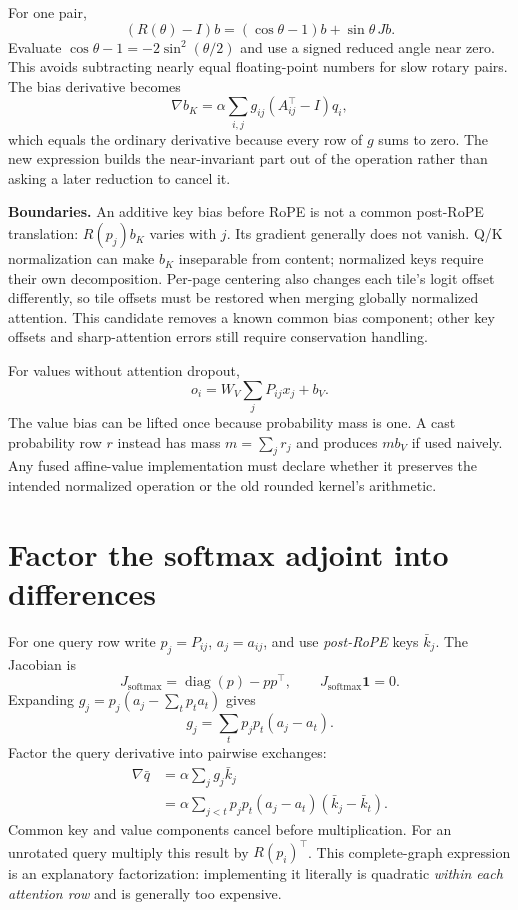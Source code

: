 \documentclass[11pt]{article}
\newcommand{\sm}{\operatorname{softmax}}
\newcommand{\diag}{\operatorname{diag}}
\begin{document}
For one pair,
\begin{equation}
 (R(\theta)-I)b=(\cos\theta-1)b+\sin\theta\,Jb.
\end{equation}
Evaluate $\cos\theta-1=-2\sin^2(\theta/2)$ and use a signed reduced angle near zero. This avoids subtracting nearly equal floating-point numbers for slow rotary pairs. The bias derivative becomes
\begin{equation}
 \nabla b_K=\alpha\sum_{i,j}g_{ij}(A_{ij}^\top-I)q_i,
\end{equation}
which equals the ordinary derivative because every row of $g$ sums to zero. The new expression builds the near-invariant part out of the operation rather than asking a later reduction to cancel it.

\textbf{Boundaries.} An additive key bias before RoPE is not a common post-RoPE translation: $R(p_j)b_K$ varies with $j$. Its gradient generally does not vanish. Q/K normalization can make $b_K$ inseparable from content; normalized keys require their own decomposition. Per-page centering also changes each tile's logit offset differently, so tile offsets must be restored when merging globally normalized attention. This candidate removes a known common bias component; other key offsets and sharp-attention errors still require conservation handling.

For values without attention dropout,
\begin{equation}
 o_i=W_V\sum_jP_{ij}x_j+b_V.
\end{equation}
The value bias can be lifted once because probability mass is one. A cast probability row $r$ instead has mass $m=\sum_jr_j$ and produces $m b_V$ if used naively. Any fused affine-value implementation must declare whether it preserves the intended normalized operation or the old rounded kernel's arithmetic.

\section{Factor the softmax adjoint into differences}

For one query row write $p_j=P_{ij}$, $a_j=a_{ij}$, and use \emph{post-RoPE} keys $\bar k_j$. The Jacobian is
\begin{equation}
 J_{\sm}=\diag(p)-pp^\top,\qquad J_{\sm}\mathbf1=0.
\end{equation}
Expanding $g_j=p_j(a_j-\sum_t p_ta_t)$ gives
\begin{equation}
 g_j=\sum_t p_jp_t(a_j-a_t).
\end{equation}
Factor the query derivative into pairwise exchanges:
\begin{align}
 \nabla\bar q
 &=\alpha\sum_jg_j\bar k_j\\
 &=\alpha\sum_{j<t}p_jp_t(a_j-a_t)(\bar k_j-\bar k_t).
\end{align}
Common key and value components cancel before multiplication. For an unrotated query multiply this result by $R(p_i)^\top$. This complete-graph expression is an explanatory factorization: implementing it literally is quadratic \emph{within each attention row} and is generally too expensive.
\end{document}
